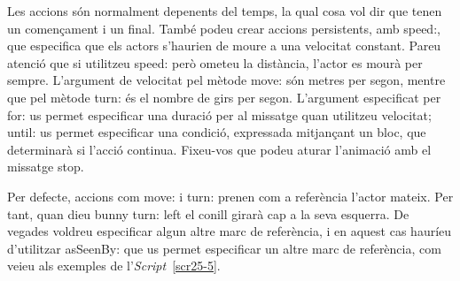 Les accions són normalment depenents del temps, la qual cosa vol dir que tenen un començament i un final. També podeu crear accions persistents, amb \textsf{speed:}, que especifica que els actors s'haurien de moure a una velocitat constant. Pareu atenció que si utilitzeu \textsf{speed:} però ometeu la distància, l'actor es mourà per sempre. L'argument de velocitat pel mètode \textsf{move:} són metres per segon, mentre que pel mètode \textsf{turn:} és el nombre de girs per segon. L'argument especificat per \textsf{for:} us permet especificar una duració per al missatge quan utilitzeu velocitat; \textsf{until:} us permet especificar una condició, expressada mitjançant un bloc, que determinarà si l'acció continua. Fixeu-vos que podeu aturar l'animació amb el missatge \textsf{stop}.

Per defecte, accions com \textsf{move:} i \textsf{turn:} prenen com a referència l'actor mateix. Per tant, quan dieu \textsf{bunny turn: left} el conill girarà cap a la seva esquerra. De vegades voldreu especificar algun altre marc de referència, i en aquest cas hauríeu d'utilitzar \textsf{asSeenBy:} que us permet especificar un altre marc de referència, com veieu als exemples de l'\emph{Script}~\ref{scr25-5}.
   

